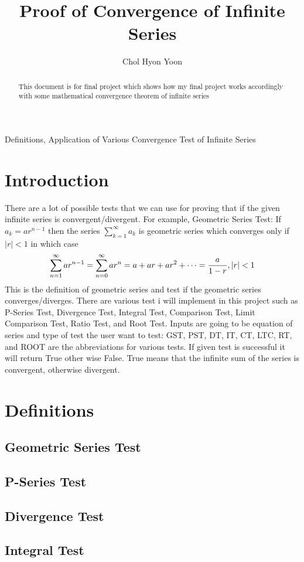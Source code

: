 \documentclass[12pt]{article}
\title{Proof of Convergence of Infinite Series}
\author{Chol Hyon Yoon}
\begin{document}
\maketitle
Definitions, Application of Various Convergence Test of Infinite Series

\begin{abstract}
This document is for final project which shows how my final project works accordingly with some mathematical convergence theorem of infinite series
\end{abstract}

\section{Introduction}

There are a lot of possible tests that we can use for proving that if the given infinite series is convergent/divergent. For example, 
Geometric Series Test: If $a_k = a r^{n-1}$ then the series $\sum_{k=1}^{\infty}a_k$ is geometric series which converges only if $|r|<1$ in which case
\[
\sum_{n=1}^{\infty}ar^{n-1}=\sum_{n=0}^{\infty}ar^n = a + ar + ar^2 + \dots   = {a \over 1-r}, |r|<1
\]
This is the definition of geometric series and test if the geometric series converges/diverges. There are various test i will implement in this project such as P-Series Test, Divergence Test, Integral Test, Comparison Test, Limit Comparison Test, Ratio Test, and Root Test. Inputs are going to be equation of series and type of test the user want to test: GST, PST, DT, IT, CT, LTC, RT, and ROOT are the abbreviations for various tests. If given test is successful it will return True other wise False. True means that the infinite sum of the series is convergent, otherwise divergent. 

\section{Definitions}
\label{sec:def}
\subsection{Geometric Series Test}
\subsection{P-Series Test}
\subsection{Divergence Test}
\subsection{Integral Test}
\end{document}
